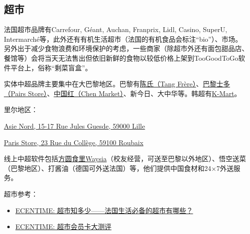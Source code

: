 \subsection{超市}

法国超市品牌有Carrefour, Géant, Auchan, Franprix, Lidl, Casino, SuperU, Intermarché等，此外还有有机生活超市（法国的有机食品会标注“bio”）、市场。另外出于减少食物浪费和环境保护的考虑，一些商家（除超市外还有面包甜品店、餐馆等）会将当天无法售出但依旧新鲜的食物以较低价格上架到TooGoodToGo软件平台上，俗称“剩菜盲盒”。

实体中超品牌主要集中在大巴黎地区。巴黎有\href{https://www.tang-freres.fr/}{陈氏（Tang Frère）}、\href{https://paris-store.com/}{巴黎士多（Pairs Store）}、\href{https://www.instagram.com/chenmarketfr/?hl=en}{中国红（Chen Market）}、新今日、大中华等。韩超有\href{https://www.instagram.com/kmartfrance/?hl=en}{K-Mart}。

里尔地区：

\href{https://maps.app.goo.gl/arekUkxV9KnKrmaj8}{Asie Nord, 15-17 Rue Jules Guesde, 59000 Lille}

\href{https://maps.app.goo.gl/4teSNmTntTzK39y36}{Paris Store, 23 Rue du Collège, 59100 Roubaix}

线上中超软件包括\href{https://mywaysia.com/en}{方圆食里Waysia}（校友经营，可送至巴黎以外地区）、悟空送菜（巴黎地区）、打酱油（德国可外送法国）等，他们提供中国食材和24$\times$7外送服务。

超市参考：
\begin{itemize}
    \item \href{https://www.ecentime.com/article/supermarket}{ECENTIME: 超市知多少——法国生活必备的超市有哪些？}
    \item \href{https://www.ecentime.com/article/ecentime-supermarketfrance}{ECENTIME: 超市会员卡大测评}
\end{itemize}
